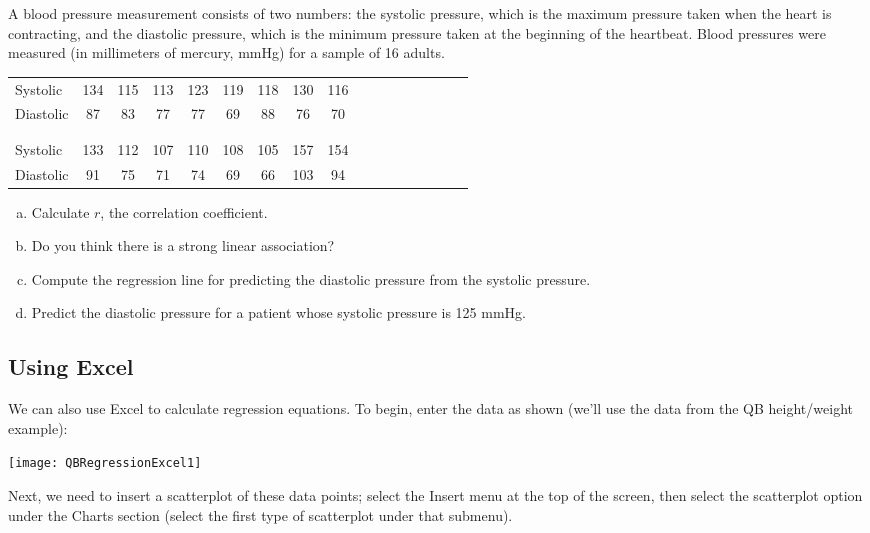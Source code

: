 \begin{try}
A blood pressure measurement consists of two numbers: the systolic pressure, which is the maximum pressure taken when the heart is contracting, and the diastolic pressure, which is the minimum pressure taken at the beginning of the heartbeat.  Blood pressures were measured (in millimeters of mercury, mmHg) for a sample of 16 adults.
\begin{center}
\begin{tabular}{l | c c c c c c c c c c c c c c c c}
Systolic & 134 & 115 & 113 & 123 & 119 & 118 & 130 & 116\\
Diastolic & 87 & 83 & 77 & 77 & 69 & 88 & 76 & 70\\
\\
\hline
\\
Systolic & 133 & 112 & 107 & 110 & 108 & 105 & 157 & 154\\
Diastolic & 91 & 75 & 71 & 74 & 69 & 66 & 103 & 94
\end{tabular}
\end{center}

\begin{enumerate}[(a)]
\item Calculate $r$, the correlation coefficient.
\item Do you think there is a strong linear association?
\item Compute the regression line for predicting the diastolic pressure from the systolic pressure.
\item Predict the diastolic pressure for a patient whose systolic pressure is 125 mmHg.
\end{enumerate}
\end{try}

\subsection{Using Excel}
We can also use Excel to calculate regression equations.  To begin, enter the data as shown (we'll use the data from the QB height/weight example):

\begin{center}
\texttt{[image: QBRegressionExcel1]}
\end{center}
\pagebreak

Next, we need to insert a scatterplot of these data points; select the Insert menu at the top of the screen, then select the scatterplot option under the Charts section (select the first type of scatterplot under that submenu).

